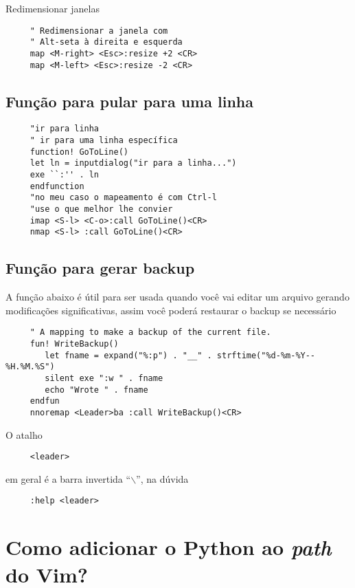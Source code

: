 Redimensionar janelas

\begin{verbatim}
     " Redimensionar a janela com
     " Alt-seta à direita e esquerda
     map <M-right> <Esc>:resize +2 <CR>
     map <M-left> <Esc>:resize -2 <CR>
\end{verbatim}

\subsection{Função para pular para uma linha}
\label{Função para pular para uma linha}

\begin{verbatim}
     "ir para linha
     " ir para uma linha específica
     function! GoToLine()
     let ln = inputdialog("ir para a linha...")
     exe ``:'' . ln
     endfunction
     "no meu caso o mapeamento é com Ctrl-l
     "use o que melhor lhe convier
     imap <S-l> <C-o>:call GoToLine()<CR>
     nmap <S-l> :call GoToLine()<CR>
\end{verbatim}

\subsection{Função para gerar backup}
\label{Função para gerar backup}

A função abaixo é útil para ser usada quando você vai editar um arquivo
gerando modificações significativas, assim você poderá restaurar o backup se necessário

\begin{verbatim}
     " A mapping to make a backup of the current file.
     fun! WriteBackup()
        let fname = expand("%:p") . "__" . strftime("%d-%m-%Y--%H.%M.%S")
        silent exe ":w " . fname
        echo "Wrote " . fname
     endfun
     nnoremap <Leader>ba :call WriteBackup()<CR>
\end{verbatim}

O atalho

\begin{verbatim}
     <leader>
\end{verbatim}

em geral é a barra invertida ``$\backslash$'', na dúvida

\begin{verbatim}
     :help <leader>
\end{verbatim}

\section{Como adicionar o Python ao {\em path} do Vim?}
\label{Como adicionar o python ao path do Vim?}


